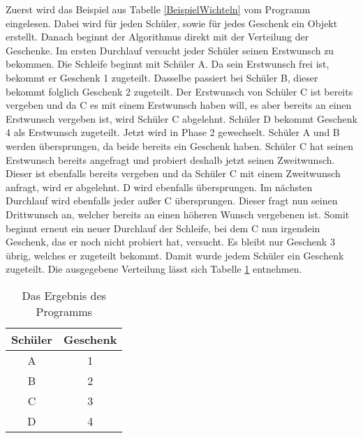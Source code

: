 \documentclass[a4paper, 12pt]{scrartcl}
\begin{document}
Zuerst wird das Beispiel aus Tabelle \ref{BeispielWichteln} vom Programm eingelesen. Dabei wird für jeden Schüler, sowie für jedes Geschenk ein Objekt erstellt. Danach beginnt der Algorithmus direkt mit der Verteilung der Geschenke. Im ersten Durchlauf versucht jeder Schüler seinen Erstwunsch zu bekommen. Die Schleife beginnt mit Schüler A. Da sein Erstwunsch frei ist, bekommt er Geschenk 1 zugeteilt. Dasselbe passiert bei Schüler B, dieser bekommt folglich Geschenk 2 zugeteilt. Der Erstwunsch von Schüler C ist bereits vergeben und da C es mit einem Erstwunsch haben will, es aber bereits an einen Erstwunsch vergeben ist, wird Schüler C abgelehnt. Schüler D bekommt Geschenk 4 als Erstwunsch zugeteilt. Jetzt wird in Phase 2 gewechselt. Schüler A und B werden übersprungen, da beide bereits ein Geschenk haben. Schüler C hat seinen Erstwunsch bereits angefragt und probiert deshalb jetzt seinen Zweitwunsch. Dieser ist ebenfalls bereits vergeben und da Schüler C mit einem Zweitwunsch anfragt, wird er abgelehnt. D wird ebenfalls übersprungen. Im nächsten Durchlauf wird ebenfalls jeder außer C übersprungen. Dieser fragt nun seinen Drittwunsch an, welcher bereits an einen höheren Wunsch vergebenen ist. Somit beginnt erneut ein neuer Durchlauf der Schleife, bei dem C nun irgendein Geschenk, das er noch nicht probiert hat, versucht. Es bleibt nur Geschenk 3 übrig, welches er zugeteilt bekommt. Damit wurde jedem Schüler ein Geschenk zugeteilt. Die ausgegebene Verteilung lässt sich Tabelle \ref{WichtelnErgebnis} entnehmen.

\begin{table}[ht]
    \centering
\begin{tabular}{@{}cc@{}}
\toprule
\multicolumn{1}{l}{Schüler} & \multicolumn{1}{l}{Geschenk} \\ \midrule
A                           & 1                            \\
B                           & 2                            \\
C                           & 3                            \\
D                           & 4                            \\ \bottomrule
\end{tabular}

    \caption{Das Ergebnis des Programms\label{WichtelnErgebnis}}
\end{table}
\end{document}
